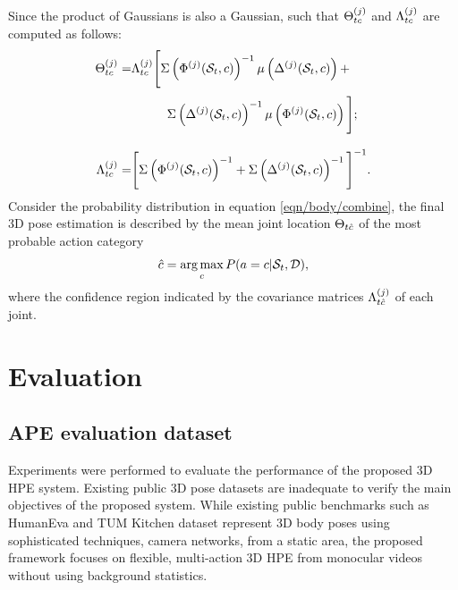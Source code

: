 Since the product of Gaussians is also a Gaussian, such that $\Theta^{(j)}_{t c}$ and $\Lambda^{(j)}_{t c}$ are computed as follows:  
\begin{equation}
	\label{eqn/body/combine2}
	\begin{split}
		\finalbodypose^{(j)}_{\timenow c} = & \finalvariance^{(j)}_{\timenow c} 
		\Bigg[
			\Sigma\left(\Phi^{(j)}(\snippetnow, c)\right)^{-1} 
			\mu\left(\toffsetfunc^{(j)}(\snippetnow, c)\right) + \\[1mm] 
			& \hspace{10mm} \Sigma\left(\toffsetfunc^{(j)}(\snippetnow, c)\right)^{-1} 
			\mu\left(\Phi^{(j)}(\snippetnow, c)\right)
		\Bigg];\\[3mm] 
		\finalvariance^{(j)}_{\timenow c} = &  
		\Bigg[
			\Sigma\left(\Phi^{(j)}(\snippetnow, c)\right)^{-1}
			+
			\Sigma\left(\toffsetfunc^{(j)}(\snippetnow, c)\right)^{-1} 
		\Bigg]^{-1}.
		\end{split}
	\end{equation}
	Consider the probability distribution in equation \ref{eqn/body/combine}, the final 3D pose estimation is described by the mean joint location $\Theta_{t\hat{c}}$ of the most probable action category 
\begin{equation} 
	\hat{c} = \operatorname*{arg\,max}_c  P(a = c | \mathcal{S}_{t}, \mathcal{D}), 
\end{equation}
where the confidence region indicated by the covariance matrices $\Lambda^{(j)}_{t\hat{c}}$ of each joint. 

\section{Evaluation}
\label{sec/body/evaluation}

\subsection{APE evaluation dataset}
Experiments were performed to evaluate the performance of the proposed 3D HPE system.
Existing public 3D pose datasets are inadequate to verify the main objectives of the proposed system.  
While existing public benchmarks such as HumanEva \cite{Sigal2010} and TUM Kitchen dataset \cite{Yao2012} represent 3D body poses using sophisticated techniques, \eg camera networks, from a static area, the proposed framework focuses on flexible, multi-action 3D HPE from monocular videos without using background statistics.

